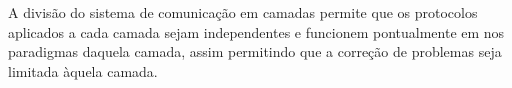 A divisão do sistema de comunicação em camadas permite que os protocolos aplicados a cada camada sejam independentes e funcionem pontualmente em nos paradigmas daquela camada, assim permitindo que a correção de problemas seja limitada àquela camada.